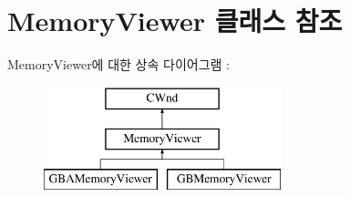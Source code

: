 \hypertarget{class_memory_viewer}{}\section{Memory\+Viewer 클래스 참조}
\label{class_memory_viewer}
Memory\+Viewer에 대한 상속 다이어그램 \+: \begin{figure}[H]
\begin{center}
\leavevmode
\includegraphics[height=3.000000cm]{class_memory_viewer}
\end{center}
\end{figure}
